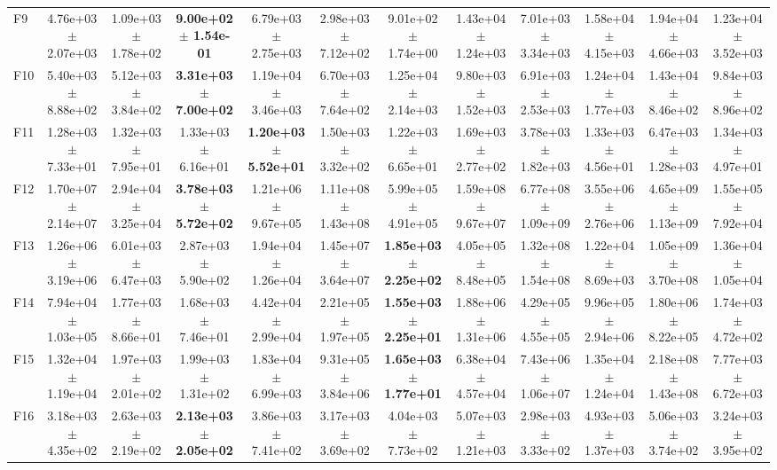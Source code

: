 \begin{table}
{\begin{tabular}{lccccccccccc}
F9 & 4.76e+03 $\pm$ 2.07e+03 & 1.09e+03 $\pm$ 1.78e+02 & \textbf{9.00e+02 $\pm$ 1.54e-01} & 6.79e+03 $\pm$ 2.75e+03 & 2.98e+03 $\pm$ 7.12e+02 & 9.01e+02 $\pm$ 1.74e+00 & 1.43e+04 $\pm$ 1.24e+03 & 7.01e+03 $\pm$ 3.34e+03 & 1.58e+04 $\pm$ 4.15e+03 & 1.94e+04 $\pm$ 4.66e+03 & 1.23e+04 $\pm$ 3.52e+03 \\
F10 & 5.40e+03 $\pm$ 8.88e+02 & 5.12e+03 $\pm$ 3.84e+02 & \textbf{3.31e+03 $\pm$ 7.00e+02} & 1.19e+04 $\pm$ 3.46e+03 & 6.70e+03 $\pm$ 7.64e+02 & 1.25e+04 $\pm$ 2.14e+03 & 9.80e+03 $\pm$ 1.52e+03 & 6.91e+03 $\pm$ 2.53e+03 & 1.24e+04 $\pm$ 1.77e+03 & 1.43e+04 $\pm$ 8.46e+02 & 9.84e+03 $\pm$ 8.96e+02 \\
F11 & 1.28e+03 $\pm$ 7.33e+01 & 1.32e+03 $\pm$ 7.95e+01 & 1.33e+03 $\pm$ 6.16e+01 & \textbf{1.20e+03 $\pm$ 5.52e+01} & 1.50e+03 $\pm$ 3.32e+02 & 1.22e+03 $\pm$ 6.65e+01 & 1.69e+03 $\pm$ 2.77e+02 & 3.78e+03 $\pm$ 1.82e+03 & 1.33e+03 $\pm$ 4.56e+01 & 6.47e+03 $\pm$ 1.28e+03 & 1.34e+03 $\pm$ 4.97e+01 \\
F12 & 1.70e+07 $\pm$ 2.14e+07 & 2.94e+04 $\pm$ 3.25e+04 & \textbf{3.78e+03 $\pm$ 5.72e+02} & 1.21e+06 $\pm$ 9.67e+05 & 1.11e+08 $\pm$ 1.43e+08 & 5.99e+05 $\pm$ 4.91e+05 & 1.59e+08 $\pm$ 9.67e+07 & 6.77e+08 $\pm$ 1.09e+09 & 3.55e+06 $\pm$ 2.76e+06 & 4.65e+09 $\pm$ 1.13e+09 & 1.55e+05 $\pm$ 7.92e+04 \\
F13 & 1.26e+06 $\pm$ 3.19e+06 & 6.01e+03 $\pm$ 6.47e+03 & 2.87e+03 $\pm$ 5.90e+02 & 1.94e+04 $\pm$ 1.26e+04 & 1.45e+07 $\pm$ 3.64e+07 & \textbf{1.85e+03 $\pm$ 2.25e+02} & 4.05e+05 $\pm$ 8.48e+05 & 1.32e+08 $\pm$ 1.54e+08 & 1.22e+04 $\pm$ 8.69e+03 & 1.05e+09 $\pm$ 3.70e+08 & 1.36e+04 $\pm$ 1.05e+04 \\
F14 & 7.94e+04 $\pm$ 1.03e+05 & 1.77e+03 $\pm$ 8.66e+01 & 1.68e+03 $\pm$ 7.46e+01 & 4.42e+04 $\pm$ 2.99e+04 & 2.21e+05 $\pm$ 1.97e+05 & \textbf{1.55e+03 $\pm$ 2.25e+01} & 1.88e+06 $\pm$ 1.31e+06 & 4.29e+05 $\pm$ 4.55e+05 & 9.96e+05 $\pm$ 2.94e+06 & 1.80e+06 $\pm$ 8.22e+05 & 1.74e+03 $\pm$ 4.72e+02 \\
F15 & 1.32e+04 $\pm$ 1.19e+04 & 1.97e+03 $\pm$ 2.01e+02 & 1.99e+03 $\pm$ 1.31e+02 & 1.83e+04 $\pm$ 6.99e+03 & 9.31e+05 $\pm$ 3.84e+06 & \textbf{1.65e+03 $\pm$ 1.77e+01} & 6.38e+04 $\pm$ 4.57e+04 & 7.43e+06 $\pm$ 1.06e+07 & 1.35e+04 $\pm$ 1.24e+04 & 2.18e+08 $\pm$ 1.43e+08 & 7.77e+03 $\pm$ 6.72e+03 \\
F16 & 3.18e+03 $\pm$ 4.35e+02 & 2.63e+03 $\pm$ 2.19e+02 & \textbf{2.13e+03 $\pm$ 2.05e+02} & 3.86e+03 $\pm$ 7.41e+02 & 3.17e+03 $\pm$ 3.69e+02 & 4.04e+03 $\pm$ 7.73e+02 & 5.07e+03 $\pm$ 1.21e+03 & 2.98e+03 $\pm$ 3.33e+02 & 4.93e+03 $\pm$ 1.37e+03 & 5.06e+03 $\pm$ 3.74e+02 & 3.24e+03 $\pm$ 3.95e+02 \\

\end{tabular}}
\end{table}
